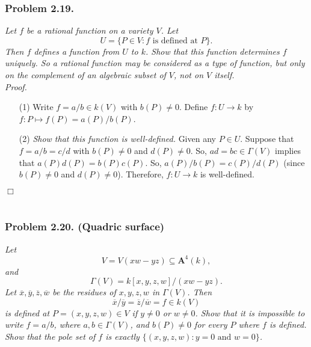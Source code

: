 \documentclass{article}
\begin{document}



\subsubsection*{Problem 2.19.}
\emph{Let $f$ be a rational function on a variety $V$.
Let
\[
  U = \{ P \in V : \text{$f$ is defined at $P$} \}.
\]
Then $f$ defines a function from $U$ to $k$.
Show that this function determines $f$ uniquely.
So a rational function may be considered as a type of function,
but only on the complement of an algebraic subset of $V$, not on $V$ itself.} \\



\emph{Proof.}
\begin{enumerate}
\item[(1)]
  Write $f = a/b \in k(V)$ with $b(P) \neq 0$.
  Define $f: U \to k$ by $f: P \mapsto f(P) = a(P)/b(P)$.

\item[(2)]
  \emph{Show that this function is well-defined.}
  Given any $P \in U$.
  Suppose that $f = a/b = c/d$ with $b(P) \neq 0$ and $d(P) \neq 0$.
  So, $ad = bc \in \Gamma(V)$ implies that $a(P) d(P) = b(P) c(P)$.
  So, $a(P)/b(P) = c(P)/d(P)$ (since $b(P) \neq 0$ and $d(P) \neq 0$).
  Therefore, $f: U \to k$ is well-defined.
\end{enumerate}
$\Box$ \\\\






\subsubsection*{Problem 2.20. (Quadric surface)}
\emph{Let
\[
  V = V(xw-yz) \subseteq \mathbf{A}^{4}(k),
\]
and
\[
  \Gamma(V) = k[x,y,z,w]/(xw-yz).
\]
Let $\overline{x},\overline{y},\overline{z},\overline{w}$ be the residues of $x, y, z, w$ in $\Gamma(V)$.
Then
\[
  \overline{x}/\overline{y} = \overline{z}/\overline{w} = f \in k(V)
\]
is defined at
$P = (x,y,z,w) \in V$ if $y \neq 0$ or $w \neq 0$.
Show that it is impossible to write $f = a/b$,
where $a,b \in \Gamma(V)$, and $b(P) \neq 0$ for every $P$ where $f$ is defined.
Show that the pole set of $f$ is exactly $\{ (x,y,z,w) : y = 0 \text{ and } w = 0 \}$.} \\
\end{document}
